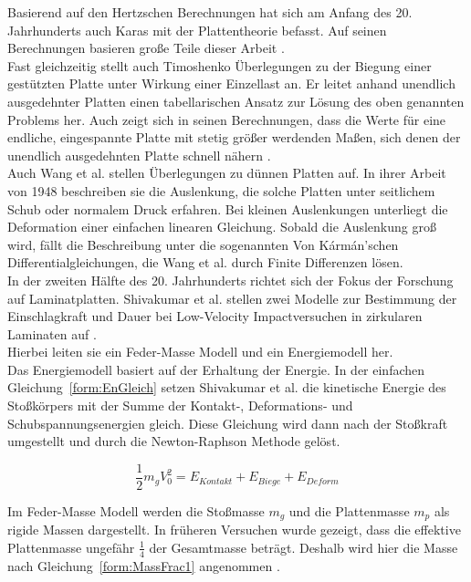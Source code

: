 Basierend auf den Hertzschen Berechnungen hat sich am Anfang des 20. Jahrhunderts auch Karas mit der Plattentheorie befasst. Auf seinen Berechnungen basieren große Teile dieser Arbeit \cite{Karas.1939}.\\
Fast gleichzeitig stellt auch Timoshenko\cite{Timoshenko.1922} Überlegungen zu der Biegung einer gestützten Platte unter Wirkung einer Einzellast an. Er leitet anhand unendlich ausgedehnter Platten einen tabellarischen Ansatz zur Lösung des oben genannten Problems her. Auch zeigt sich in seinen Berechnungen, dass die Werte für eine endliche, eingespannte Platte mit stetig größer werdenden Maßen, sich denen der unendlich ausgedehnten Platte schnell nähern .\\
Auch Wang et al.\cite{Wang.1947} stellen Überlegungen zu dünnen Platten auf. In ihrer Arbeit von 1948 beschreiben sie die Auslenkung, die solche Platten unter seitlichem Schub oder normalem Druck erfahren. Bei kleinen Auslenkungen unterliegt die Deformation einer einfachen linearen Gleichung. Sobald die Auslenkung groß wird, fällt die Beschreibung unter die sogenannten Von Kármán'schen Differentialgleichungen, die Wang et al. durch Finite Differenzen lösen.\\
In der zweiten Hälfte des 20. Jahrhunderts richtet sich der Fokus der Forschung auf Laminatplatten. Shivakumar et al. stellen zwei Modelle zur Bestimmung der Einschlagkraft und Dauer bei Low-Velocity Impactversuchen in zirkularen Laminaten auf \cite{Shivakumar.1985}. \\
Hierbei leiten sie ein Feder-Masse Modell und ein Energiemodell her. \\
Das Energiemodell basiert auf der Erhaltung der Energie. In der einfachen Gleichung~\ref{form:EnGleich} setzen Shivakumar et al. die kinetische Energie des Stoßkörpers mit der Summe der Kontakt-, Deformations- und Schubspannungsenergien gleich. Diese Gleichung wird dann nach der Stoßkraft umgestellt und durch die Newton-Raphson Methode gelöst.

\begin{equation}
	\label{form:EnGleich}
	\frac{1}{2} m_{g} V_{0}^{2} = E_{Kontakt} + E_{Biege} + E_{Deform}
\end{equation}

Im Feder-Masse Modell werden die Stoßmasse $m_g$ und die Plattenmasse $m_p$ als rigide Massen dargestellt. In früheren Versuchen wurde gezeigt, dass die effektive Plattenmasse ungefähr $\frac{1}{4}$ der Gesamtmasse beträgt. Deshalb wird hier die Masse nach Gleichung~\ref{form:MassFrac1} angenommen \cite{Shivakumar.1985}. 

